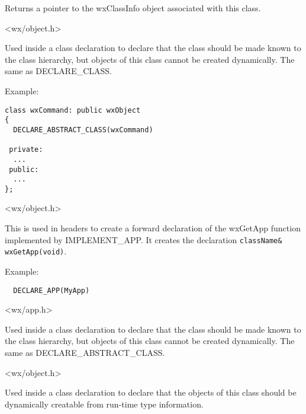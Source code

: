 Returns a pointer to the wxClassInfo object associated with this class.


<wx/object.h>



Used inside a class declaration to declare that the class should be
made known to the class hierarchy, but objects of this class cannot be created
dynamically. The same as DECLARE\_CLASS.

Example:

\begin{verbatim}
class wxCommand: public wxObject
{
  DECLARE_ABSTRACT_CLASS(wxCommand)

 private:
  ...
 public:
  ...
};
\end{verbatim}


<wx/object.h>

\label{declareapp}


This is used in headers to create a forward declaration of the wxGetApp function implemented
by IMPLEMENT\_APP. It creates the declaration {\tt className\& wxGetApp(void)}.

Example:

\begin{verbatim}
  DECLARE_APP(MyApp)
\end{verbatim}


<wx/app.h>



Used inside a class declaration to declare that the class should be
made known to the class hierarchy, but objects of this class cannot be created
dynamically. The same as DECLARE\_ABSTRACT\_CLASS.


<wx/object.h>



Used inside a class declaration to declare that the objects of this class should be dynamically
creatable from run-time type information.

